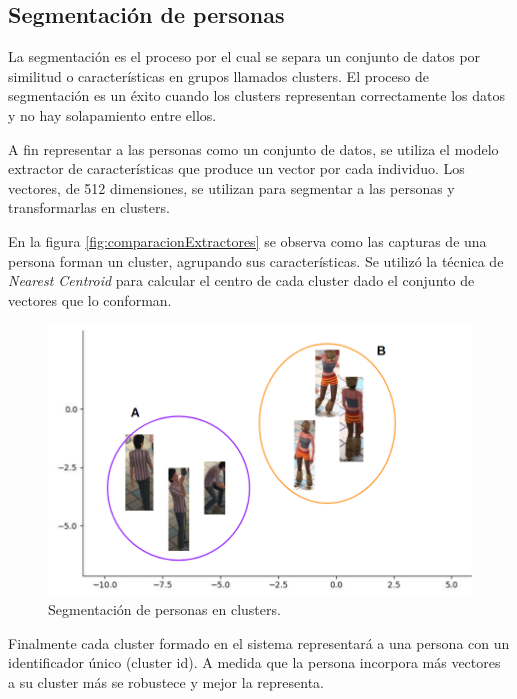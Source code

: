 \subsection{Segmentación de personas}

La segmentación es el proceso por el cual se separa un conjunto de datos por similitud o características en grupos llamados clusters. El proceso de segmentación es un éxito cuando los clusters representan correctamente los datos y no hay solapamiento entre ellos.

A fin representar a las personas como un conjunto de datos, se utiliza el modelo extractor de características que produce un vector por cada individuo. Los vectores, de 512 dimensiones, se utilizan para segmentar a las personas y transformarlas en clusters.

En la figura \ref{fig:comparacionExtractores} se observa como las capturas de una persona forman un cluster, agrupando sus características. Se utilizó la técnica de \textit{Nearest Centroid} \citep{NEAREST_CENTROID} para calcular el centro de cada cluster dado el conjunto de vectores que lo conforman.

\begin{figure}[ht]
	\centering
	\includegraphics[scale=.6]{./Figures/clusterPersonas.png}
	\caption{Segmentación de personas en clusters.}
	\label{fig:clusterPersonas}
\end{figure}

Finalmente cada cluster formado en el sistema representará a una persona con un identificador único (cluster id). A medida que la persona incorpora más vectores a su cluster más se robustece y mejor la representa.

\newpage


